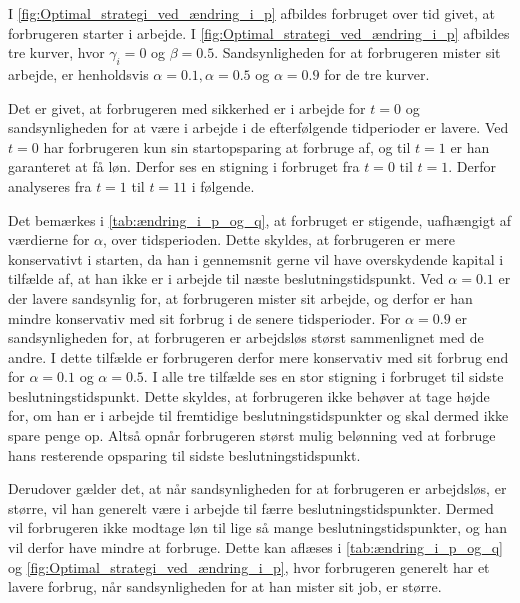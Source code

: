 I \autoref{fig:Optimal_strategi_ved_ændring_i_p}  afbildes forbruget over tid givet, at forbrugeren starter i arbejde. I \autoref{fig:Optimal_strategi_ved_ændring_i_p} afbildes tre kurver, hvor $\gamma_i=0$ og $\beta=0.5$. Sandsynligheden for at forbrugeren mister sit arbejde, er henholdsvis $\alpha=0.1, \alpha=0.5$ og $\alpha=0.9$ for de tre kurver. 



Det er givet, at forbrugeren med sikkerhed er i arbejde for $t=0$ og sandsynligheden for at være i arbejde i de efterfølgende tidperioder er lavere. Ved $t=0$ har forbrugeren kun sin startopsparing at forbruge af, og til $t=1$ er han garanteret at få løn. Derfor ses en stigning i forbruget fra $t=0$ til $t=1$. Derfor analyseres fra $t=1$ til $t=11$ i følgende. 

Det bemærkes i \autoref{tab:ændring_i_p_og_q}, at forbruget er stigende, uafhængigt af værdierne for $\alpha$, over tidsperioden. Dette skyldes, at forbrugeren er mere konservativt i starten, da han i gennemsnit gerne vil have overskydende kapital i tilfælde af, at han ikke er i arbejde til næste beslutningstidspunkt. 
Ved $\alpha=0.1$ er der lavere sandsynlig for, at forbrugeren mister sit arbejde, og derfor er han mindre konservativ med sit forbrug i de senere tidsperioder. For $\alpha=0.9$ er sandsynligheden for, at forbrugeren er arbejdsløs størst sammenlignet med de andre. I dette tilfælde er forbrugeren derfor mere konservativ med sit forbrug end for $\alpha=0.1$ og $\alpha=0.5$. I alle tre tilfælde ses en stor stigning i forbruget til sidste beslutningstidspunkt. Dette skyldes, at forbrugeren ikke behøver at tage højde for, om han er i arbejde til fremtidige beslutningstidspunkter og skal dermed ikke spare penge op. Altså opnår forbrugeren størst mulig belønning ved at forbruge hans resterende opsparing til sidste beslutningstidspunkt.

Derudover gælder det, at når sandsynligheden for at forbrugeren er arbejdsløs, er større, vil han generelt være i arbejde til færre beslutningstidspunkter. Dermed vil forbrugeren ikke modtage løn til lige så mange beslutningstidspunkter, og han vil derfor have mindre at forbruge. Dette kan aflæses i \autoref{tab:ændring_i_p_og_q} og \autoref{fig:Optimal_strategi_ved_ændring_i_p}, hvor forbrugeren generelt har et lavere forbrug, når sandsynligheden for at han mister sit job, er større. 

